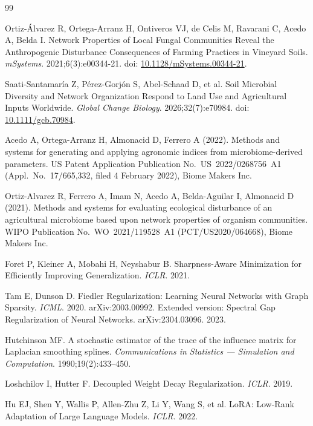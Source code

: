 \documentclass[11pt,a4paper]{article}
\begin{document}
\begin{thebibliography}{99}

Ortiz-\'Alvarez R, Ortega-Arranz H, Ontiveros VJ, de Celis M, Ravarani C,
Acedo A, Belda I.
Network Properties of Local Fungal Communities Reveal the Anthropogenic
Disturbance Consequences of Farming Practices in Vineyard Soils.
\textit{mSystems}. 2021;6(3):e00344-21.
doi: \href{https://doi.org/10.1128/mSystems.00344-21}{10.1128/mSystems.00344-21}.

Saati-Santamar\'ia Z, P\'erez-Gorj\'on S, Abel-Schaad D, et al.
Soil Microbial Diversity and Network Organization Respond to Land Use and
Agricultural Inputs Worldwide.
\textit{Global Change Biology}. 2026;32(7):e70984.
doi: \href{https://doi.org/10.1111/gcb.70984}{10.1111/gcb.70984}.

Acedo A, Ortega-Arranz H, Almonacid D, Ferrero A (2022).
Methods and systems for generating and applying agronomic indices from
microbiome-derived parameters.
US Patent Application Publication No.\ US~2022/0268756~A1
(Appl.\ No.\ 17/665,332, filed 4 February 2022), Biome Makers Inc.

Ortiz-Alvarez R, Ferrero A, Imam N, Acedo A, Belda-Aguilar I, Almonacid D
(2021).
Methods and systems for evaluating ecological disturbance of an agricultural
microbiome based upon network properties of organism communities.
WIPO Publication No.\ WO~2021/119528~A1 (PCT/US2020/064668), Biome Makers Inc.

Foret P, Kleiner A, Mobahi H, Neyshabur B.
Sharpness-Aware Minimization for Efficiently Improving Generalization.
\textit{ICLR}. 2021.

Tam E, Dunson D.
Fiedler Regularization: Learning Neural Networks with Graph Sparsity.
\textit{ICML}. 2020. arXiv:2003.00992.
Extended version: Spectral Gap Regularization of Neural Networks.
arXiv:2304.03096. 2023.

Hutchinson MF.
A stochastic estimator of the trace of the influence matrix for Laplacian
smoothing splines.
\textit{Communications in Statistics --- Simulation and Computation}.
1990;19(2):433--450.

Loshchilov I, Hutter F.
Decoupled Weight Decay Regularization.
\textit{ICLR}. 2019.

Hu EJ, Shen Y, Wallis P, Allen-Zhu Z, Li Y, Wang S, et al.
LoRA: Low-Rank Adaptation of Large Language Models.
\textit{ICLR}. 2022.


\end{thebibliography}
\end{document}
